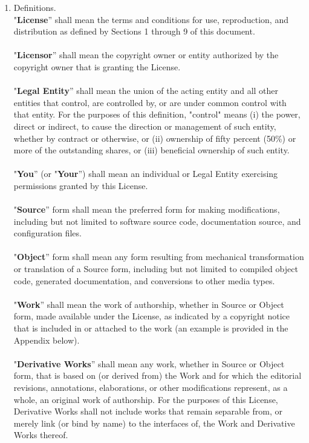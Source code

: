 \begin{enumerate}
\item Definitions.\hfill \\
"\textbf{License}'' shall mean the terms and conditions for use, reproduction, and distribution as defined by Sections 1 through 9 of this document.\\\\
"\textbf{Licensor}'' shall mean the copyright owner or entity authorized by the copyright owner that is granting the License.\\\\
"\textbf{Legal Entity}'' shall mean the union of the acting entity and all other entities that control, are controlled by, or are under common control with that entity. For the purposes of this definition, "control" means (i) the power, direct or indirect, to cause the direction or management of such entity, whether by contract or otherwise, or (ii) ownership of fifty percent (50\%) or more of the outstanding shares, or (iii) beneficial ownership of such entity.\\\\
"\textbf{You}'' (or "\textbf{Your}'') shall mean an individual or Legal Entity exercising permissions granted by this License.\\\\
"\textbf{Source}'' form shall mean the preferred form for making modifications, including but not limited to software source code, documentation source, and configuration files.\\\\
"\textbf{Object}'' form shall mean any form resulting from mechanical transformation or translation of a Source form, including but not limited to compiled object code, generated documentation, and conversions to other media types.\\\\
"\textbf{Work}'' shall mean the work of authorship, whether in Source or Object form, made available under the License, as indicated by a copyright notice that is included in or attached to the work (an example is provided in the Appendix below).\\\\
"\textbf{Derivative Works}'' shall mean any work, whether in Source or Object form, that is based on (or derived from) the Work and for which the editorial revisions, annotations, elaborations, or other modifications represent, as a whole, an original work of authorship. For the purposes of this License, Derivative Works shall not include works that remain separable from, or merely link (or bind by name) to the interfaces of, the Work and Derivative Works thereof.\\\\

\end{enumerate}
